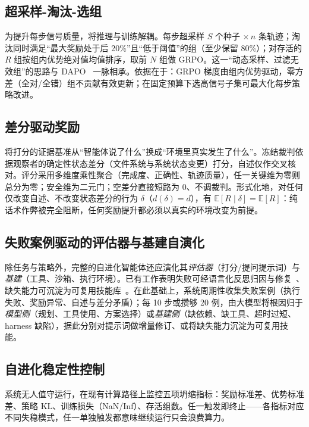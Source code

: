 \documentclass[twocolumn,a4paper]{ctexart}
\begin{document}
\subsection{超采样-淘汰-选组}

为提升每步信号质量，将推理与训练解耦。每步超采样 $S$ 个种子 $\times\,n$ 条轨迹；淘汰同时满足“最大奖励处于后 20\%”且“低于阈值”的组（至少保留 80\%）；对存活的 $R$ 组按组内优势绝对值均值排序，取前 $N$ 组做 GRPO。这一“动态采样、过滤无效组”的思路与 DAPO~\cite{dapo} 一脉相承。依据在于：GRPO 梯度由组内优势驱动，零方差（全对/全错）组不贡献有效更新；在固定预算下选高信号子集可最大化每步策略改进。

\subsection{差分驱动奖励}

将打分的证据基准从“智能体说了什么”换成“环境里真实发生了什么”。冻结裁判依据观察者的确定性状态差分（文件系统与系统状态变更）打分，自述仅作交叉核对。评分采用多维度乘性聚合（完成度、正确性、轨迹质量），任一关键维为零则总分为零；安全维为二元门；空差分直接短路为 0、不调裁判。形式化地，对任何仅改变自述、不改变状态差分的行为 $\delta$（$d(\delta)=d$），有 $\mathbb{E}[R\mid\delta]=\mathbb{E}[R]$：纯话术作弊被完全阻断，任何奖励提升都必须以真实的环境改变为前提。

\subsection{失败案例驱动的评估器与基建自演化}

除任务与策略外，完整的自进化智能体还应演化其\emph{评估器}（打分/提问提示词）与\emph{基建}（工具、沙箱、执行环境）。已有工作表明失败可经语言化反思归因与修复~\cite{reflexion}、缺失能力可沉淀为可复用技能库~\cite{voyager}。在此基础上，系统周期性收集失败案例（执行失败、奖励异常、自述与差分矛盾）；每 10 步或攒够 20 例，由大模型将根因归于\emph{模型侧}（规划、工具使用、方案选择）或\emph{基建侧}（缺依赖、缺工具、超时过短、harness 缺陷），据此分别对提示词做增量修订、或将缺失能力沉淀为可复用技能。

\subsection{自进化稳定性控制}

系统无人值守运行，在现有计算路径上监控五项坍缩指标：奖励标准差、优势标准差、策略 KL、训练损失（NaN/Inf）、存活组数。任一触发即终止——各指标对应不同失稳模式，任一单独触发都意味继续运行只会浪费算力。
\end{document}
